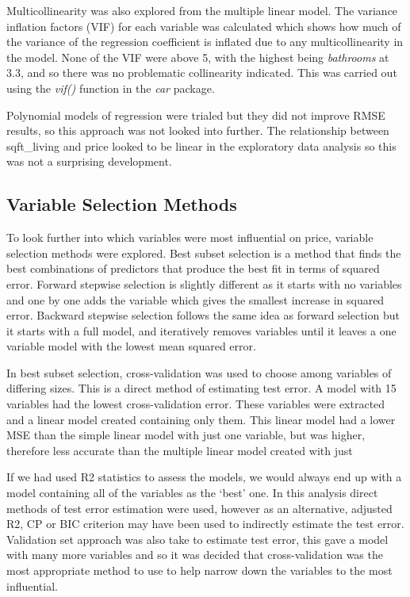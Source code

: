 \documentclass[
]{article}
\begin{document}
Multicollinearity was also explored from the multiple linear model. The
variance inflation factors (VIF) for each variable was calculated which
shows how much of the variance of the regression coefficient is inflated
due to any multicollinearity in the model. None of the VIF were above 5,
with the highest being \emph{bathrooms} at 3.3, and so there was no
problematic collinearity indicated. This was carried out using the
\emph{vif()} function in the \emph{car} package.

Polynomial models of regression were trialed but they did not improve
RMSE results, so this approach was not looked into further. The
relationship between sqft\_living and price looked to be linear in the
exploratory data analysis so this was not a surprising development.

\hypertarget{variable-selection-methods}{%
\subsection{Variable Selection
Methods}\label{variable-selection-methods}}

To look further into which variables were most influential on price,
variable selection methods were explored. Best subset selection is a
method that finds the best combinations of predictors that produce the
best fit in terms of squared error. Forward stepwise selection is
slightly different as it starts with no variables and one by one adds
the variable which gives the smallest increase in squared error.
Backward stepwise selection follows the same idea as forward selection
but it starts with a full model, and iteratively removes variables until
it leaves a one variable model with the lowest mean squared error.

In best subset selection, cross-validation was used to choose among
variables of differing sizes. This is a direct method of estimating test
error. A model with 15 variables had the lowest cross-validation error.
These variables were extracted and a linear model created containing
only them. This linear model had a lower MSE than the simple linear
model with just one variable, but was higher, therefore less accurate
than the multiple linear model created with just

If we had used R2 statistics to assess the models, we would always end
up with a model containing all of the variables as the `best' one. In
this analysis direct methods of test error estimation were used, however
as an alternative, adjusted R2, CP or BIC criterion may have been used
to indirectly estimate the test error. Validation set approach was also
take to estimate test error, this gave a model with many more variables
and so it was decided that cross-validation was the most appropriate
method to use to help narrow down the variables to the most influential.
\end{document}
